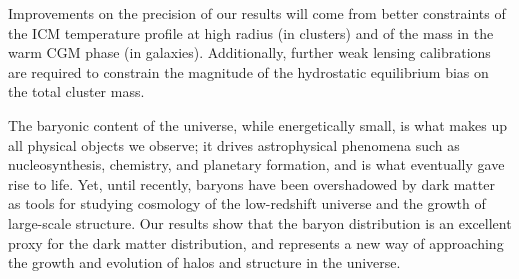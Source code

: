 Improvements on the precision of our results will come from better
constraints of the ICM temperature profile at high radius (in
clusters) and of the mass in the warm CGM phase (in
galaxies). Additionally, further weak lensing calibrations are
required to constrain the magnitude of the hydrostatic equilibrium
bias on the total cluster mass. 

The baryonic content of the universe, while energetically small, is
what makes up all physical objects we observe; it drives astrophysical
phenomena such as nucleosynthesis, chemistry, and planetary formation,
and is what eventually gave rise to life. Yet, until recently, baryons
have been overshadowed by dark matter as tools for studying cosmology
of the low-redshift universe and the growth of large-scale
structure. Our results show that the baryon distribution is an
excellent proxy for the dark matter distribution, and represents a new
way of approaching the growth and evolution of halos and structure in
the universe.
